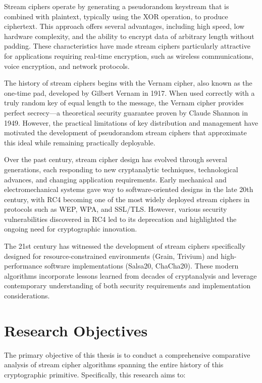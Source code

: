 \documentclass[12pt,a4paper,oneside]{report}
\begin{document}
Stream ciphers operate by generating a pseudorandom keystream that is combined with plaintext, typically using the XOR operation, to produce ciphertext. This approach offers several advantages, including high speed, low hardware complexity, and the ability to encrypt data of arbitrary length without padding. These characteristics have made stream ciphers particularly attractive for applications requiring real-time encryption, such as wireless communications, voice encryption, and network protocols.

The history of stream ciphers begins with the Vernam cipher, also known as the one-time pad, developed by Gilbert Vernam in 1917. When used correctly with a truly random key of equal length to the message, the Vernam cipher provides perfect secrecy—a theoretical security guarantee proven by Claude Shannon in 1949. However, the practical limitations of key distribution and management have motivated the development of pseudorandom stream ciphers that approximate this ideal while remaining practically deployable.

Over the past century, stream cipher design has evolved through several generations, each responding to new cryptanalytic techniques, technological advances, and changing application requirements. Early mechanical and electromechanical systems gave way to software-oriented designs in the late 20th century, with RC4 becoming one of the most widely deployed stream ciphers in protocols such as WEP, WPA, and SSL/TLS. However, various security vulnerabilities discovered in RC4 led to its deprecation and highlighted the ongoing need for cryptographic innovation.

The 21st century has witnessed the development of stream ciphers specifically designed for resource-constrained environments (Grain, Trivium) and high-performance software implementations (Salsa20, ChaCha20). These modern algorithms incorporate lessons learned from decades of cryptanalysis and leverage contemporary understanding of both security requirements and implementation considerations.

\section{Research Objectives}
\label{sec:objectives}

The primary objective of this thesis is to conduct a comprehensive comparative analysis of stream cipher algorithms spanning the entire history of this cryptographic primitive. Specifically, this research aims to:
\end{document}
